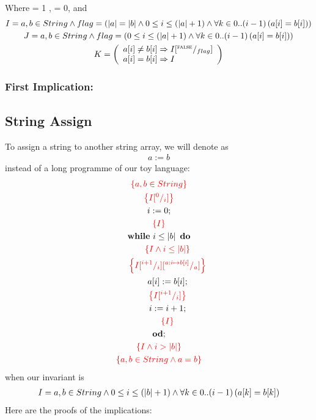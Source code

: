 \documentclass[a4paper,12pt,fleqn]{scrartcl}
\newcommand{\assn}[1]{{\color{red}\left\{#1\right\}}}
\newcommand{\length}[1]{\left|#1\right|}
\begin{document}
Where \True = 1 , \False = 0, and 
\begin{gather*}
    I = a,b \in String \And flag = ( \length{a}= \length{b} \And 0 \leq i \leq (\length{a}+1)
     \And \All{k \in 0..(i-1) }{a[i] = b[i]})\\
    J = a,b \in String \And flag = (0 \leq i \leq (\length{a}+1)
    \And \All{k \in 0..(i-1) }{a[i] = b[i]})\\
    K =
    \left(\begin{array}[c]{l}
        a[i] \neq b[i] \Implies I \subst{\False}{flag}\\
        a[i] =    b[i] \Implies I 
    \end{array}\right)
\end{gather*}

\subsubsection*{First Implication:}


\subsection*{String Assign}
To assign a string to another string array, we will denote as 
\begin{gather*}
    a := b 
\end{gather*}
instead of a long programme of our toy language:
\begin{gather*}
    \assn{a,b\in String}\\
    \assn{I \subst{0}{i} }\\
    i\Ass 0;\\
    \assn{I}\\
    \WHILE~i\leq\length{b}~\DO\\
        \qquad \assn{I \And i\leq \length{b}}\\
        \qquad \assn{I \subst{i+1}i \subst{a:i\mapsto b[i]}{a}}\\
        \qquad a[i] \Ass b[i];\\
        \qquad \assn{I \subst{i+1}i}\\
        \qquad i \Ass i +1;\\
        \qquad \assn{I}\\
    \OD;\\
    \assn{I\And i>\length{b}}\\
    \assn{a,b \in String\And a=b }
\end{gather*}
when our invariant is 
\begin{gather*}
    I = a,b\in String \And 0 \leq i \leq (\length{b}+1) \And \All{k \in 0..(i-1)}{ a[k] = b[k]}  
\end{gather*}
Here are the proofs of the implications:
\end{document}
